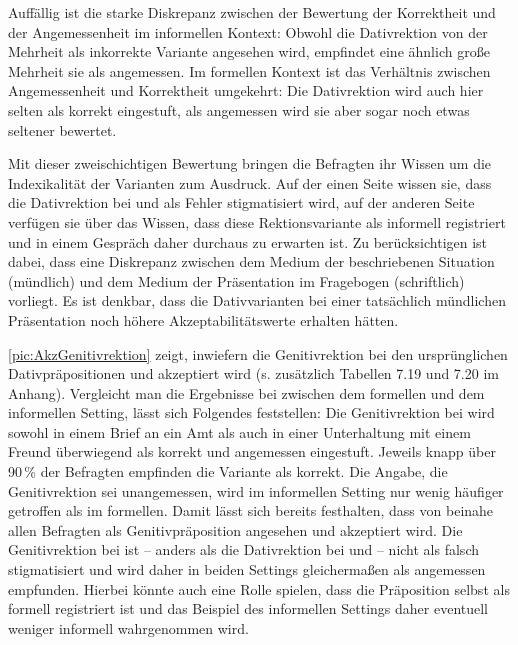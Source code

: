 Auffällig ist die starke Diskrepanz zwischen der Bewertung der Korrektheit und der Angemessenheit im informellen Kontext:
Obwohl die Dativrektion von der Mehrheit als inkorrekte Variante angesehen wird, empfindet eine ähnlich große Mehrheit sie als angemessen. 
Im formellen Kontext ist das Verhältnis zwischen Angemessenheit und Korrektheit umgekehrt: Die Dativrektion wird auch hier selten als korrekt eingestuft, als angemessen wird sie aber sogar noch etwas seltener bewertet.\largerpage

Mit dieser zweischichtigen Bewertung bringen die Befragten ihr Wissen um die Indexikalität der Varianten zum Ausdruck. 
Auf der einen Seite wissen sie, dass die Dativrektion bei \wegen{} und \waehrend{} als Fehler stigmatisiert wird, auf der anderen Seite verfügen sie über das Wissen, dass diese Rektionsvariante als informell registriert und in einem Gespräch daher durchaus zu erwarten ist. %
Zu berücksichtigen ist dabei, dass eine Diskrepanz zwischen dem Medium der beschriebenen Situation (mündlich) und dem Medium der Präsentation im Fragebogen (schriftlich) vorliegt. 
Es ist denkbar, dass die Dativvarianten bei einer tatsächlich mündlichen Präsentation noch höhere Akzeptabilitätswerte erhalten hätten. %

\autoref{pic:AkzGenitivrektion} zeigt, inwiefern die Genitivrektion bei den ursprünglichen Dativpräpositionen \dank{} und \gegenueber{} akzeptiert wird (s. zusätzlich Tabellen 7.19 und 7.20 im Anhang). 
Vergleicht man die Ergebnisse bei \dank{} zwischen dem formellen und dem informellen Setting, lässt sich Folgendes feststellen: 
Die Genitivrektion bei \dank{} wird sowohl in einem Brief an ein Amt als auch in einer Unterhaltung mit einem Freund überwiegend als korrekt und angemessen eingestuft. 
Jeweils knapp über 90\,\% der Befragten empfinden die Variante als korrekt. 
Die Angabe, die Genitivrektion sei unangemessen, wird im informellen Setting nur wenig häufiger getroffen als im formellen.
Damit lässt sich bereits festhalten, dass \dank{} von beinahe allen Befragten als Genitivpräposition angesehen und akzeptiert wird. 
Die Genitivrektion bei \dank{} ist -- anders als die Dativrektion bei \wegen{} und \waehrend{} -- nicht als falsch stigmatisiert und wird daher in beiden Settings gleichermaßen als angemessen empfunden. %
Hierbei könnte auch eine Rolle spielen, dass die Präposition \dank{} selbst als formell registriert ist und das Beispiel des informellen Settings daher eventuell weniger informell wahrgenommen wird.%

